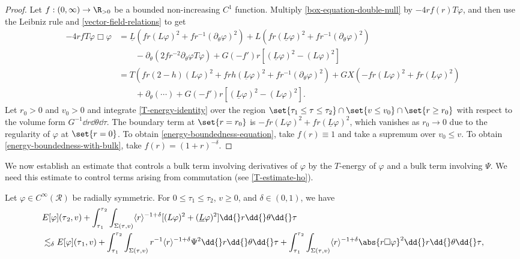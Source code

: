 \documentclass[10pt, reqno]{amsart}
\begin{document}
\begin{proof}
Let \(f : (0,\infty)\to \R_{>0}\) be a bounded non-increasing \(C^1\) function. Multiply
\cref{box-equation-double-null} by \(-4rf(r)T\varphi{}\), and then use the Leibniz rule and
\cref{vector-field-relations} to get
\begin{equation}\label{T-energy-identity}
\begin{split}
-4rfT\varphi{}\Box{}\varphi{} &= \underline{L}(fr(L\varphi{})^2 + fr^{-1}(\partial{}_\theta{}\varphi{})^2) + L(fr(\underline{L}\varphi{})^2 + fr^{-1}(\partial{}_\theta{}\varphi{})^2) \\
&\qquad - \partial{}_\theta{}(2fr^{-2}\partial{}_\theta{}\varphi{}T\varphi{}) +  G(-f')r[(\underline{L}\varphi{})^2 - (L\varphi{})^2]\\
&=  T(fr(2-h)(L\varphi{})^2 + frh(\underline{L}\varphi{})^2 + fr^{-1}(\partial{}_\theta{}\varphi{})^2) + GX(-fr(L\varphi{})^2 + fr(\underline{L}\varphi{})^2) \\
&\qquad + \partial{}_\theta{}(\cdots{}) + G(-f')r[(\underline{L}\varphi{})^2 - (L\varphi{})^2].
\end{split}
\end{equation}
Let \(r_0> 0\) and \(v_0 > 0\) and integrate \cref{T-energy-identity}
over the region \(\set{\tau_1\le \tau{}\le \tau_2}\cap \set{v\le v_0}\cap
\set{r\ge r_0}\) with respect to the volume form \(G^{-1}\dd{}r\dd{}\theta{}\dd{}\tau{}\). The boundary term at \(\set{r=r_0}\) is \(-f r(L\varphi{})^2 +
f r(\underline{L}\varphi{})^2\), which vanishes as \(r_0\to 0\) due to the
regularity of \(\varphi{}\) at \(\set{r=0}\). To obtain
\cref{energy-boundedness-equation}, take \(f(r)\equiv 1\) and take a supremum over
\(v_0\le v\). To obtain \cref{energy-boundedness-with-bulk}, take \(f(r) = (1+r)^{-\delta{}}\).
\end{proof}
We now establish an estimate that controls a bulk term involving derivatives of
\(\varphi{}\) by the \(T\)-energy of \(\varphi{}\) and a bulk term involving
\(\Psi{}\). We need this estimate to control terms arising from commutation (see \cref{T-estimate-ho}).
\begin{proposition}
Let \(\varphi{}\in C^\infty(\mathcal{R})\) be radially symmetric. For \(0\le \tau{}_1\le \tau{}_2\), \(v\ge 0\), and \(\delta{}\in (0,1)\), we have
\begin{equation}\label{morawetz-axisymmetric-equation}
\begin{split}
&E[\varphi{}](\tau{}_2,v) + \int_{\tau{}_1}^{\tau{}_2} \int _{\Sigma{}(\tau{},v)} \langle{}r\rangle{}^{-1+\delta{}}[(L\varphi{})^2 + (\underline{L}\varphi{})^2]\dd{}r\dd{}\theta{}\dd{}\tau{} \\
&\lesssim_\delta{} E[\varphi{}](\tau{}_1,v) + \int_{\tau{}_1}^{\tau{}_2} \int _{\Sigma{}(\tau{},v)} r^{-1}\langle{}r\rangle{}^{-1+\delta{}}\Psi^2 \dd{}r\dd{}\theta{}\dd{}\tau{} + \int_{\tau{}_1}^{\tau{}_2} \int _{\Sigma{}(\tau{},v)} \langle{}r\rangle{}^{-1+\delta{}}\abs{r\Box{}\varphi{}}^2 \dd{}r\dd{}\theta{}\dd{}\tau{},
\end{split}
\end{equation}
\label{morawetz-radially-symmetric}
\end{proposition}
\end{document}
